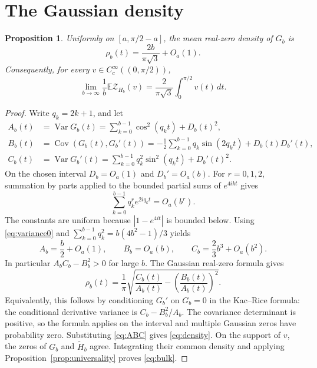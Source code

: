 \documentclass[11pt]{article}
\newtheorem{proposition}[theorem]{Proposition}
\newcommand{\E}{\mathbb E}
\newcommand{\Var}{\operatorname{Var}}
\newcommand{\Cov}{\operatorname{Cov}}
\begin{document}
\section{The Gaussian density}
\begin{proposition}\label{prop:gaussian}
Uniformly on $[a,\pi/2-a]$, the mean real-zero density of $G_b$ is
\begin{equation}\label{eq:density}
 \rho_b(t)=\frac{2b}{\pi\sqrt3}+O_a(1).
\end{equation}
Consequently, for every $v\in C_c^\infty((0,\pi/2))$,
\begin{equation}\label{eq:bulk}
 \lim_{b\to\infty}\frac1b\E\mathcal Z_{H_b}(v)
 =\frac{2}{\pi\sqrt3}\int_0^{\pi/2}v(t)\,dt.
\end{equation}
\end{proposition}
\begin{proof}
Write $q_k=2k+1$, and let
\begin{align*}
 A_b(t)&=\Var G_b(t)=\sum_{k=0}^{b-1}\cos^2(q_kt)+D_b(t)^2,\\
 B_b(t)&=\Cov(G_b(t),G_b'(t))
       =-\tfrac12\sum_{k=0}^{b-1}q_k\sin(2q_kt)+D_b(t)D_b'(t),\\
 C_b(t)&=\Var G_b'(t)=\sum_{k=0}^{b-1}q_k^2\sin^2(q_kt)+D_b'(t)^2.
\end{align*}
On the chosen interval $D_b=O_a(1)$ and $D_b'=O_a(b)$.
For $r=0,1,2$, summation by parts applied to the bounded partial sums
of $e^{4ikt}$ gives
\[
 \sum_{k=0}^{b-1}q_k^r e^{2iq_kt}=O_a(b^r).
\]
The constants are uniform because $|1-e^{4it}|$ is bounded below.
Using \eqref{eq:variance0} and
$\sum_{k=0}^{b-1}q_k^2=b(4b^2-1)/3$ yields
\begin{equation}\label{eq:ABC}
 A_b=\frac b2+O_a(1),\qquad B_b=O_a(b),\qquad
 C_b=\frac23b^3+O_a(b^2).
\end{equation}
In particular $A_bC_b-B_b^2>0$ for large $b$.
The Gaussian real-zero formula \cite[Theorem 3.1]{EK} gives
\[
 \rho_b(t)=\frac1\pi
 \sqrt{\frac{C_b(t)}{A_b(t)}-\left(\frac{B_b(t)}{A_b(t)}\right)^2}.
\]
Equivalently, this follows by conditioning $G_b'$ on $G_b=0$ in the
Kac--Rice formula: the conditional derivative variance is
$C_b-B_b^2/A_b$. The covariance determinant is positive, so the formula
applies on the interval and multiple Gaussian zeros have probability zero.
Substituting \eqref{eq:ABC} gives \eqref{eq:density}.
On the support of $v$, the zeros of $G_b$ and $\widetilde H_b$ agree.
Integrating their common density and applying Proposition~\ref{prop:universality}
proves \eqref{eq:bulk}.
\end{proof}
\end{document}
